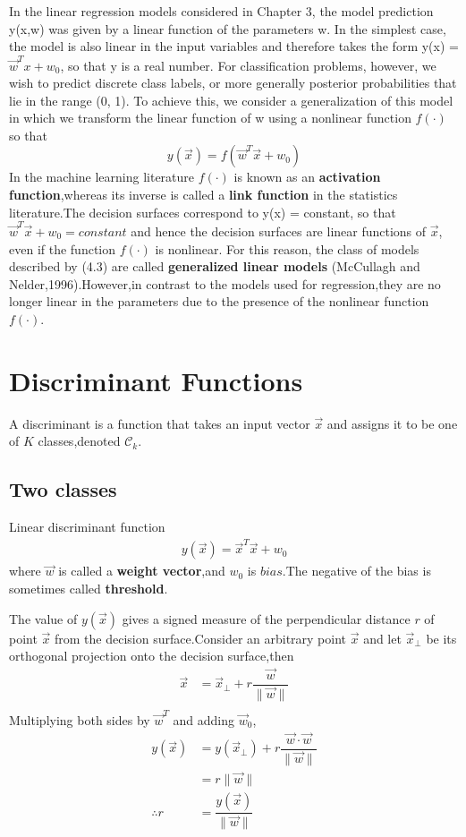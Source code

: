 In the linear regression models considered in Chapter 3, the model prediction
y(x,w) was given by a linear function of the parameters w. In the simplest case,
the model is also linear in the input variables and therefore takes the form y(x) =
$\vec{w}^Tx+w_0$, so that y is a real number. For classification problems, however, we wish
to predict discrete class labels, or more generally posterior probabilities that lie in
the range (0, 1). To achieve this, we consider a generalization of this model in which
we transform the linear function of w using a nonlinear function $f( · )$ so that
\begin{equation}
y(\vec{x}) = f(\vec{w}^T\vec{x} + w_0)
\end{equation}
In the machine learning literature $f(\cdot)$ is known as an \textbf{activation function},whereas its inverse is called a \textbf{link function} in the statistics literature.The decision surfaces correspond to y(x) = constant, so that $\vec{w}^T\vec{x} + w_0 = constant$ and hence the decision surfaces are linear functions of $\vec{x}$, even if the function $f(·)$ is nonlinear. For this reason, the class of models described by (4.3) are called \textbf{generalized linear models} (McCullagh and Nelder,1996).However,in contrast to the models used for regression,they are no longer linear in the parameters due to the presence of the nonlinear  function $f(\cdot)$.
\section{Discriminant Functions}
A discriminant is a function that takes an input vector $\vec{x}$ and assigns it to be one of $K$ classes,denoted  $\mathcal{C}_k$.
\subsection{Two classes}
Linear discriminant function
\begin{align}
y(\vec{x}) = \vec{x}^T\vec{x}+w_0
\end{align}
where $\vec{w}$ is called a \textbf{weight vector},and $w_0$ is $bias$.The negative of the bias is sometimes called \textbf{threshold}.

The value of $y(\vec{x})$ gives a signed measure of the perpendicular distance $r$ of point $\vec{x}$ from the decision surface.Consider an arbitrary point $\vec{x}$ and let $\vec{x}_\perp$ be its orthogonal projection onto the decision surface,then
\begin{align}
\vec{x} &= \vec{x}_\perp + r\dfrac{\vec{w}}{\parallel\vec{w}\parallel} \\
\end{align}
Multiplying both sides by $\vec{w}^T$ and adding $\vec{w}_0$,
\begin{align}\label{eqn:distance from point to hyperplane}
y(\vec{x}) &= y(\vec{x}_{\perp}) + r\dfrac{\vec{w}\cdot\vec{w}}{\parallel\vec{w}\parallel} \\
&= r\parallel\vec{w}\parallel\\
\therefore
r &= \dfrac{y(\vec{x})}{\parallel\vec{w}\parallel}
\end{align}

